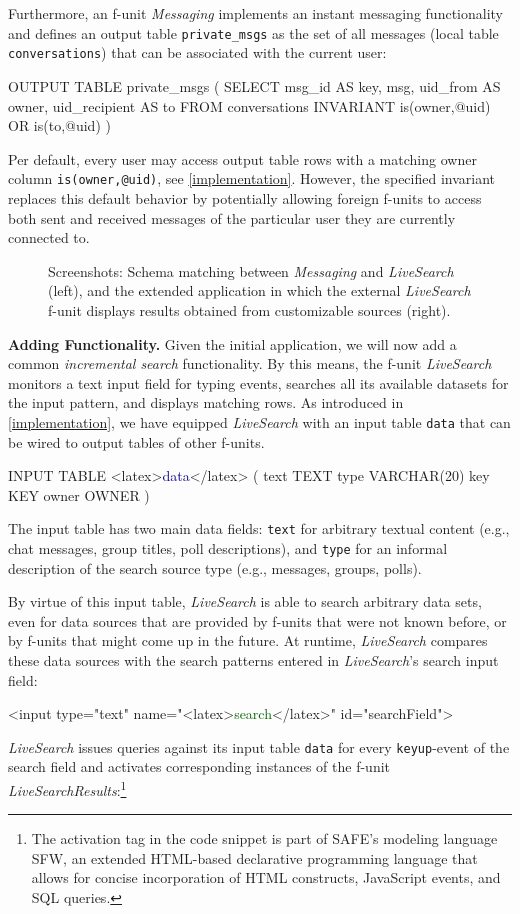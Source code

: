 \documentclass{src/acm_proc_article-sp} \else
\newcommand\myparagraph[1]{\medskip\noindent\textbf{#1.}}
\def \fig #1#2#3#4{\begin{figure}[tp]\centering\epsfig{trim=#2, clip=true, width=#3\textwidth, file=res/#1.eps}\vspace{-3mm}\caption{#4\vspace{-3mm}}\label{#1}\end{figure}}
\newcommand\SAFE{SAFE\xspace}
\begin{document}
Furthermore, an f-unit \emph{Messaging} implements an instant
messaging functionality and defines an output table
\texttt{private\_msgs} as the set of all messages (local table
\texttt{conversations}) that can be associated with the current user:
\begin{lsthere}
    OUTPUT TABLE private_msgs (
      SELECT    msg_id AS key,  msg,  uid_from AS owner,  uid_recipient AS to
      FROM      conversations
      INVARIANT is(owner,@uid) OR is(to,@uid) )
\end{lsthere}
Per default, every user may access output table rows with a matching
owner column \texttt{is(owner,@uid)}, see \autoref{implementation}.
However, the specified invariant replaces this default behavior by
potentially allowing foreign f-units to access both sent and received
messages of the particular user they are currently connected to.




\fig{screenshots}{0px 0px 0px 0px}{1}{Screenshots: Schema matching
between \emph{Messaging} and \emph{LiveSearch} (left), and the
extended application in which the external \emph{LiveSearch} f-unit
displays results obtained from customizable sources (right).}



\myparagraph{Adding Functionality}
Given the initial application, we will now add a common
\emph{incremental search} functionality. By this means, the f-unit
\emph{LiveSearch} monitors a text input field for typing events,
searches all its available datasets for the input pattern, and
displays matching rows. As introduced in \autoref{implementation}, we
have equipped \emph{LiveSearch} with an input table \texttt{data}
that can be wired to output tables of other f-units. 
\begin{lsthere}
    INPUT TABLE <latex>\textcolor{darkblue}{data}\!</latex> ( text  TEXT
                      type  VARCHAR(20)
                      key   KEY
                      owner OWNER )
\end{lsthere}
The input table
has two main data fields: \texttt{text} for arbitrary textual content
(e.g., chat messages, group titles, poll descriptions), and
\texttt{type} for an informal description of the search source type
(e.g., messages, groups, polls).

By virtue of this input table, \emph{LiveSearch} is able to search
arbitrary data sets, even for data sources that are provided by
f-units that were not known before, or by f-units that might come up
in the future. At runtime, \emph{LiveSearch} compares these data
sources with the search patterns entered in \emph{LiveSearch}'s
search input field:
\begin{lsthere}
    <input type="text" name="<latex>\textcolor{darkgreen}{search}</latex>" id="searchField">
\end{lsthere}
\emph{LiveSearch} issues queries against its input table
\texttt{data} for every \texttt{keyup}-event of the search field and
activates corresponding instances of the f-unit
\emph{LiveSearchResults}:\footnote{The activation tag in the code
snippet is part of \SAFE's modeling language SFW, an extended
HTML-based declarative programming language that allows for concise
incorporation of HTML constructs, JavaScript events, and SQL queries.}
\end{document}
